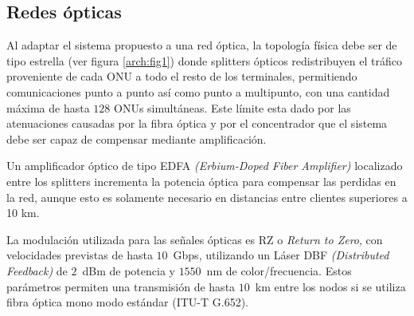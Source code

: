 \subsection{Redes ópticas}






Al adaptar el sistema propuesto a una red óptica, la topología física debe ser de tipo estrella (ver figura \ref{arch:fig1}) donde splitters ópticos redistribuyen el tráfico proveniente de cada ONU a todo el resto de los terminales, permitiendo comunicaciones punto a punto así como punto a multipunto, con una cantidad máxima de hasta $128$ ONUs simultáneas. Este límite esta dado por las atenuaciones causadas por la fibra óptica y por el concentrador que el sistema debe ser capaz de compensar mediante amplificación.

Un amplificador óptico de tipo EDFA \textit{(Erbium-Doped Fiber Amplifier)} localizado entre los splitters incrementa la potencia óptica para compensar las perdidas en la red, aunque esto es solamente necesario en distancias entre clientes superiores a 10 km.

La modulación utilizada para las señales ópticas es RZ o \textit{Return to Zero}, con velocidades previstas de hasta $10$~Gbps, utilizando un Láser DBF \textit{(Distributed Feedback)} de $2$~dBm de potencia y $1550$~nm de color/frecuencia. Estos parámetros permiten una transmisión de hasta $10$~km entre los nodos si se utiliza fibra óptica mono modo estándar (ITU-T G.652).

